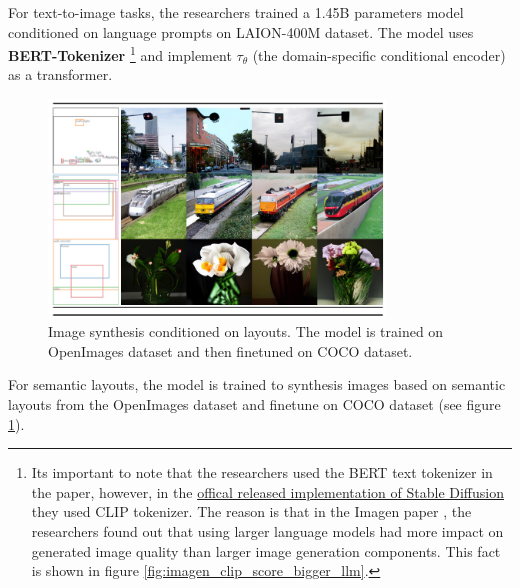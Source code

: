 For text-to-image tasks, the researchers trained a 1.45B parameters model conditioned on language prompts on LAION-400M dataset. The model uses \textbf{BERT-Tokenizer} \footnote{Its important to note that the researchers used the BERT text tokenizer in the paper, however, in the \href{https://github.com/CompVis/latent-diffusion}{offical released implementation of Stable Diffusion} they used CLIP tokenizer. The reason is that in the Imagen paper \cite{imagen}, the researchers found out that using larger language models had more impact on generated image quality than larger image generation components. This fact is shown in figure \ref{fig:imagen_clip_score_bigger_llm}.} \cite{bert} and implement $\tau_\theta$ (the domain-specific conditional encoder) as a transformer.

\begin{figure}
    \centering
    \includegraphics[width=0.8\textwidth]{images/diffusion_models/stable_diffusion/experiments_3.png}
    \caption{Image synthesis conditioned on layouts. The model is trained on OpenImages dataset and then finetuned on COCO dataset.}
    \label{fig:stable_diffusion_experiments_semantic_layouts}
\end{figure}

For semantic layouts, the model is trained to synthesis images based on semantic layouts from the OpenImages dataset and finetune on COCO dataset (see figure \ref{fig:stable_diffusion_experiments_semantic_layouts}).




